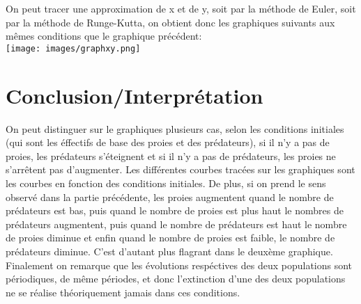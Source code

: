 \documentclass[a4paper,16pt,twoside]{report}
\begin{document}
\newpage
On peut tracer une approximation de x et de y, soit par la méthode de Euler, soit par la méthode de Runge-Kutta, on obtient donc les graphiques suivants aux mêmes conditions que le graphique précédent: \\

\texttt{[image: images/graphxy.png]}



\chapter{Conclusion/Interprétation}

On peut distinguer sur le graphiques plusieurs cas, selon les conditions initiales (qui sont les éffectifs de base des proies et des prédateurs), si il n'y a pas de proies, les prédateurs s'éteignent et si il n'y a pas de prédateurs, les proies ne s'arrêtent pas d'augmenter. Les différentes courbes tracées sur les graphiques sont les courbes en fonction des conditions initiales. De plus, si on prend le sens observé dans la partie précédente, les proies augmentent quand le nombre de prédateurs est bas, puis quand le nombre de proies est plus haut le nombres de prédateurs augmentent, puis quand le nombre de prédateurs est haut le nombre de proies diminue et enfin quand le nombre de proies est faible, le nombre de prédateurs diminue. C'est d'autant plus flagrant dans le deuxème graphique. Finalement on remarque que les évolutions respéctives des deux populations sont périodiques, de même périodes, et donc l'extinction d'une des deux populations ne se réalise théoriquement jamais dans ces conditions.
\end{document}
